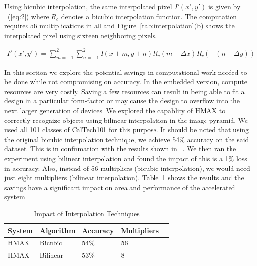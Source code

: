 Using bicubic interpolation, the same interpolated pixel $I'(x',y')$ is given by ~(\ref{eq:2}) where 
$R_c$ denotes a bicubic interpolation function. The computation requires 56 multiplications in all and Figure~\ref{tab:interpolation}(b) shows the interpolated pixel 
using sixteen neighboring pixels.

\begin{equation}
\begin{split}
I'(x',y')=\sum_{m=-1}^{2}\sum_{n=-1}^{2}I(x+m,y+n)R_c(m-\Delta x)R_c(-(n-\Delta y))
\end{split}
\label{eq:2}
\end{equation}

In this section we explore the potential savings in computational work needed to be done while not compromising on accuracy. 
In the embedded version, compute resources are very costly. Saving a few resources can result in being able to 
fit a design in a particular form-factor or may cause the design to overflow into the next larger generation of devices. We explored the 
capablity of HMAX to correctly recognize objects using bilinear interpolation in the image pyramid. We used all 101 classes of CalTech101 
for this purpose. It should be noted that using the original bicubic interpolation technique, we achieve 54\% accuracy on the said dataset. This is in confirmation with the results shown in ~\cite{Mutch2008}. 
We then ran the experiment using bilinear interpolation and found the impact of this is a 1\% loss in accuracy. Also, instead of 
56 multipliers (bicubic interpolation), we would need just eight multipliers (bilinear interpolation). Table~\ref{table:compute} shows the 
results and the savings have a significant impact on area and performance of the accelerated system. 

\begin{table}[h]
\renewcommand{\arraystretch}{1.3}
\caption {Impact of Interpolation Techniques}
\label{table:compute}
\centering
\begin{tabular}{lllll}
 System & Algorithm & Accuracy & Multipliers\\\hline
 HMAX	& Bicubic   & 54\% & 56\\\hline
 HMAX   & Bilinear  & 53\% & 8\\\hline
\end{tabular}
\end{table}
